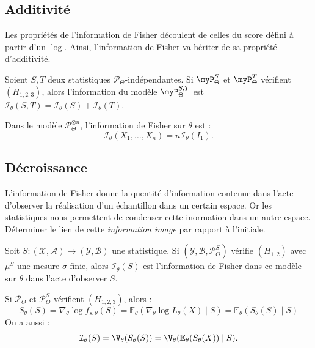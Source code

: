 \subsection{Additivité}

Les propriétés de l'information de Fisher découlent de celles du score défini 
à partir d'un $ \log$. Ainsi, l'information de Fisher va hériter de sa propriété 
d'additivité. 

\begin{proposition}
    Soient $S,T$ deux statistiques $ \mathcal{P}_\Theta$-indépendantes. Si $ \myP_\Theta^S$ et 
    $ \myP_\Theta^T$ vérifient $ (H_{1, 2, 3}) $, alors l'information du modèle $ \myP_\Theta^{S,T}$
    est $ \mathcal{I}_\theta(S, T) = \mathcal{I}_\theta(S) + \mathcal{I}_\theta(T)$. 
\end{proposition}

\begin{corollary}[Additivité]
    Dans le modèle $ \mathcal{P}_\Theta ^{\otimes n}$, l'information de Fisher sur $ \theta$ est : 
        $$ \mathcal{I}_\theta(X_1, \dots, X_n) = n \mathcal{I}_\theta(I_1). $$
\end{corollary}

\subsection{Décroissance}

L'information de Fisher donne la quentité d'information contenue dans l'acte d'observer 
la réalisation d'un échantillon dans un certain espace. Or les statistiques nous permettent 
de condenser cette inormation dans un autre espace. Déterminer le lien de cette \emph{information image}
par rapport à l'initiale. 

\begin{definition}
    Soit $ S : ( \mathcal{X}, \mathcal{A}) \longrightarrow ( \mathcal{Y}, \mathcal{B})$ une statistique. 
    Si $( \mathcal{Y}, \mathcal{B}, \mathcal{P}_\Theta^S)$ vérifie $(H_{1,2})$ avec $ \mu^S$ une mesure 
    $ \sigma$-finie, alors $ \mathcal{I}_\theta(S)$ est l'information de Fisher dans ce modèle 
    sur $ \theta$ dans l'acte d'observer $ S$.     
\end{definition}

\begin{lemma}
    Si $ \mathcal{P}_\Theta$ et $ \mathcal{P}_\Theta^S$ vérifient $(H_{1, 2, 3})$, alors : 
        $$ S_\theta(S) = \nabla_\theta \log f_{s,\theta}(S) = \mathbb{E}_\theta( \nabla_\theta \log L_\theta(X) \mid S) 
        = \mathbb{E}_\theta(S_\theta(S) \mid S) 
        $$
    On a aussi : 
        $$ \mathcal{I}_\theta(S) = \V_\theta(S_\theta(S)) = \V_\theta( \mathbb{E}_\theta(S_\theta(X)) \mid S). $$
\end{lemma}

